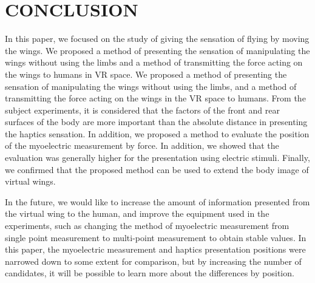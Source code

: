 \documentclass[letterpaper, 10 pt, conference]{ieeeconf}  %
\begin{document}
\section{CONCLUSION}
        In this paper, we focused on the study of giving the sensation of flying by moving the wings. 
        We proposed a method of presenting the sensation of manipulating the wings without using the limbs and a method of transmitting the force acting on the wings to humans in VR space. 
        We proposed a method of presenting the sensation of manipulating the wings without using the limbs, and a method of transmitting the force acting on the wings in the VR space to humans. 
        From the subject experiments, it is considered that the factors of the front and rear surfaces of the body are more important than the absolute distance in presenting the haptics sensation. 
        In addition, we proposed a method to evaluate the position of the myoelectric measurement by force. 
        In addition, we showed that the evaluation was generally higher for the presentation using electric stimuli. 
        Finally, we confirmed that the proposed method can be used to extend the body image of virtual wings.
    
        In the future, we would like to increase the amount of information presented from the virtual wing to the human, and improve the equipment used in the experiments, such as changing the method of myoelectric measurement from single point measurement to multi-point measurement to obtain stable values. 
        In this paper, the myoelectric measurement and haptics presentation positions were narrowed down to some extent for comparison, but by increasing the number of candidates, it will be possible to learn more about the differences by position.


\end{document}
